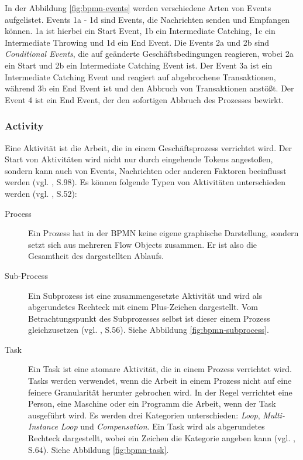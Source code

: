 
In der Abbildung \ref{fig:bpmn-events} werden verschiedene Arten von Events aufgelistet. Events 1a - 1d sind Events, die Nachrichten senden und Empfangen können. 1a ist hierbei ein Start Event, 1b ein Intermediate Catching, 1c ein Intermediate Throwing und 1d ein End Event. Die Events 2a und 2b sind \emph{Conditional Events}, die auf geänderte Geschäftsbedingungen reagieren, wobei 2a ein Start und 2b ein Intermediate Catching Event ist. Der Event 3a ist ein Intermediate Catching Event und reagiert auf abgebrochene Transaktionen, während 3b ein End Event ist und den Abbruch von Transaktionen anstößt. Der Event 4 ist ein End Event, der den sofortigen Abbruch des Prozesses bewirkt.


\subsubsection{Activity}
Eine Aktivität ist die Arbeit, die in einem Geschäftsprozess verrichtet wird. Der Start von Aktivitäten wird nicht nur durch eingehende Tokens angestoßen, sondern kann auch von Events, Nachrichten oder anderen Faktoren beeinflusst werden (vgl. \citep{BPMN2009}, S.98). Es können folgende Typen von Aktivitäten unterschieden werden (vgl. \citep{BPMN2009}, S.52):

\begin{description}
\item[Process] Ein Prozess hat in der BPMN keine eigene graphische Darstellung, sondern setzt sich aus mehreren Flow Objects zusammen. Er ist also die Gesamtheit des dargestellten Ablaufs.
\item[Sub-Process] Ein Subprozess ist eine zusammengesetzte Aktivität und wird als abgerundetes Rechteck mit einem Plus-Zeichen dargestellt. Vom Betrachtungspunkt des Subprozesses selbst ist dieser einem Prozess gleichzusetzen (vgl. \citep{BPMN2009}, S.56). Siehe Abbildung \ref{fig:bpmn-subprocess}.

\item[Task] Ein Task ist eine atomare Aktivität, die in einem Prozess verrichtet wird. Tasks werden verwendet, wenn die Arbeit in einem Prozess nicht auf eine feinere Granularität herunter gebrochen wird. In der Regel verrichtet eine Person, eine Maschine oder ein Programm die Arbeit, wenn der Task ausgeführt wird. Es werden drei Kategorien unterschieden: \emph{Loop}, \emph{Multi-Instance Loop} und \emph{Compensation}. Ein Task wird als abgerundetes Rechteck dargestellt, wobei ein Zeichen die Kategorie angeben kann (vgl. \citep{BPMN2009}, S.64). Siehe Abbildung \ref{fig:bpmn-task}.

\end{description}


